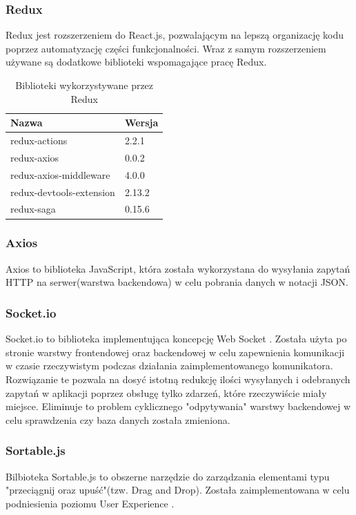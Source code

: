 \documentclass[eng,printmode]{mgr}
\begin{document}
\subsubsection{Redux}
Redux \cite{Redux} jest rozszerzeniem do React.js, pozwalającym na lepszą organizację kodu poprzez automatyzację części funkcjonalności. Wraz z samym rozszerzeniem używane są dodatkowe biblioteki wspomagające pracę Redux.

\begin{table}[H]
\begin{tabularx}{\textwidth}{|X|X|}
   \hline
    \textbf{Nazwa} & \textbf{Wersja} \\
   \hline
    redux-actions & 2.2.1 \\
   \hline
   	redux-axios & 0.0.2 \\
   \hline
  	redux-axios-middleware & 4.0.0 \\
   \hline
   	redux-devtools-extension & 2.13.2 \\
   \hline
  	redux-saga & 0.15.6 \\
   \hline
\end{tabularx}
\caption{Biblioteki wykorzystywane przez Redux}
\end{table}


\subsubsection{Axios}
Axios \cite{Axios} to biblioteka JavaScript, która została wykorzystana do wysyłania zapytań HTTP na serwer(warstwa backendowa) w celu pobrania danych w notacji JSON.

\subsubsection{Socket.io}
Socket.io \cite{SocketIO} to biblioteka implementująca koncepcję Web Socket \cite{Keyword_Websocket}. Została użyta po stronie warstwy frontendowej oraz backendowej w celu zapewnienia komunikacji w czasie rzeczywistym podczas działania zaimplementowanego komunikatora. Rozwiązanie te pozwala na dosyć istotną redukcję ilości wysyłanych i odebranych zapytań w aplikacji poprzez obsługę tylko zdarzeń, które rzeczywiście miały miejsce. Eliminuje to problem cyklicznego "odpytywania" warstwy backendowej w celu sprawdzenia czy baza danych została zmieniona.

\subsubsection{Sortable.js}
Bilbioteka Sortable.js \cite{SortableJS} to obszerne narzędzie do zarządzania elementami typu "przeciągnij oraz upuść"(tzw. Drag and Drop). Została zaimplementowana w celu podniesienia poziomu User Experience \cite{Keyword_UserExperience}.
\end{document}
